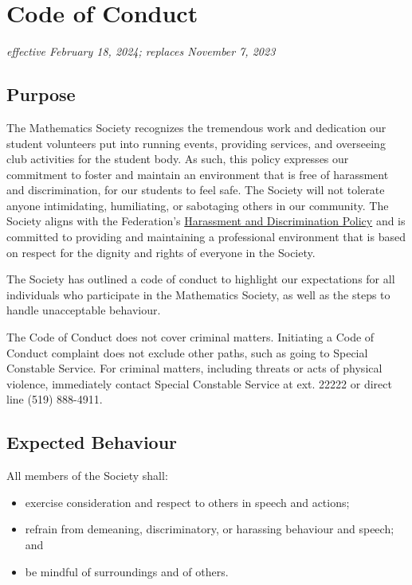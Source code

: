 \section{Code of Conduct}
\emph{effective February 18, 2024; replaces November 7, 2023}\\

\subsection{Purpose}
The Mathematics Society recognizes the tremendous work and dedication our student volunteers put into running events, providing services, and overseeing club activities for the student body. As such, this policy expresses our commitment to foster and maintain an environment that is free of harassment and discrimination, for our students to feel safe. The Society will not tolerate anyone intimidating, humiliating, or sabotaging others in our community. The Society aligns with the Federation's \href{https://wusa.ca/document/harassment-and-discrimination-policy/}{Harassment and Discrimination Policy} and is committed to providing and maintaining a professional environment that is based on respect for the dignity and rights of everyone in the Society.

The Society has outlined a code of conduct to highlight our expectations for all individuals who participate in the Mathematics Society, as well as the steps to handle unacceptable behaviour.

The Code of Conduct does not cover criminal matters. Initiating a Code of Conduct complaint does not exclude other paths, such as going to Special Constable Service. For criminal matters, including threats or acts of physical violence, immediately contact Special Constable Service at ext. 22222 or direct line (519) 888-4911.

\subsection{Expected Behaviour}
All members of the Society shall:
\begin{itemize}
	\item exercise consideration and respect to others in speech and actions;
	\item refrain from demeaning, discriminatory, or harassing behaviour and speech; and
	\item be mindful of surroundings and of others.
\end{itemize}

